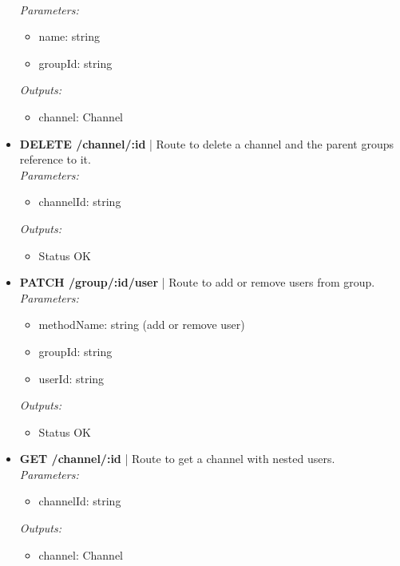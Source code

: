 \documentclass[11pt, conference,letterpaper]{IEEEtran}
\begin{document}
\begin{itemize}
        \\ \textit{Parameters: }
        \begin{itemize}
            \item name: string
            \item groupId: string
        \end{itemize}
        \textit{Outputs: }
        \begin{itemize}
            \item channel: Channel
        \end{itemize}
    \item \textbf{DELETE /channel/:id} | Route to  delete a channel and the parent groups reference to it.
        \\ \textit{Parameters: }
        \begin{itemize}
            \item channelId: string
        \end{itemize}
        \textit{Outputs: }
        \begin{itemize}
            \item Status OK
        \end{itemize}
    \item \textbf{PATCH /group/:id/user} | Route to add or remove users from group. 
        \\ \textit{Parameters: }
        \begin{itemize}
            \item methodName: string (add or remove user)
            \item groupId: string
            \item userId: string
        \end{itemize}
        \textit{Outputs: }
        \begin{itemize}
            \item Status OK
        \end{itemize}
    \item \textbf{GET /channel/:id} | Route to get a channel with nested users.
        \\ \textit{Parameters: }
        \begin{itemize}
            \item channelId: string
        \end{itemize}
        \textit{Outputs: }
        \begin{itemize}
            \item channel: Channel
        \end{itemize}

\end{itemize}
\end{document}
